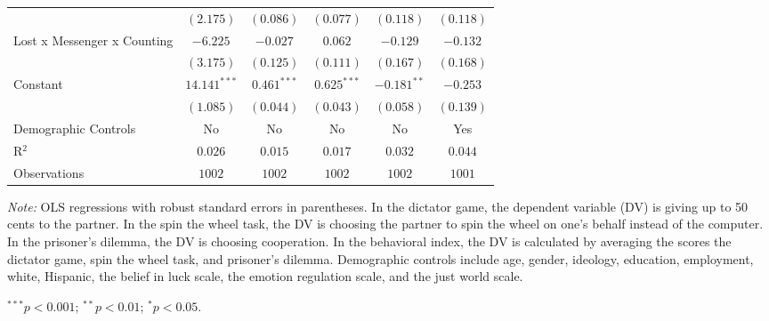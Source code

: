 \begin{table}[!t]
\begin{center}
{\begin{threeparttable}
\begin{tabular}{l c c c c c}
                            & $(2.175)$      & $(0.086)$     & $(0.077)$     & $(0.118)$     & $(0.118)$    \\
Lost x Messenger x Counting & $-6.225$       & $-0.027$      & $0.062$       & $-0.129$      & $-0.132$     \\
                            & $(3.175)$      & $(0.125)$     & $(0.111)$     & $(0.167)$     & $(0.168)$    \\
Constant                    & $14.141^{***}$ & $0.461^{***}$ & $0.625^{***}$ & $-0.181^{**}$ & $-0.253$     \\
                            & $(1.085)$      & $(0.044)$     & $(0.043)$     & $(0.058)$     & $(0.139)$    \\
\midrule
Demographic Controls        & No             & No            & No            & No            & Yes          \\
R$^2$                       & $0.026$        & $0.015$       & $0.017$       & $0.032$       & $0.044$      \\
Observations                & $1002$         & $1002$        & $1002$        & $1002$        & $1001$       \\
\bottomrule
\end{tabular}
\begin{tablenotes}[flushleft]
\scriptsize{\item[\hspace{-5mm}] \textit{Note:} OLS regressions with robust standard errors in parentheses. 
                                In the dictator game, the dependent variable (DV) is giving up to 50 cents to the partner. 
                                In the spin the wheel task, the DV is choosing the partner to spin the wheel on one’s behalf instead of the computer. 
                                In the prisoner’s dilemma, the DV is choosing cooperation. 
                                In the behavioral index, the DV is calculated by averaging the scores the dictator game, spin the wheel task, and prisoner's dilemma.
                                Demographic controls include age, gender, ideology,
                                education, employment, white, Hispanic, the belief in luck scale, the emotion regulation scale, and the just world scale. \item[\hspace{-5mm}] $^{***}p<0.001$; $^{**}p<0.01$; $^{*}p<0.05$.}
\end{tablenotes}
\end{threeparttable}
}
\label{tab:behavior_shared_regression_counting}
\end{center}
\end{table}

\renewcommand{\baselinestretch}{1.67}%
